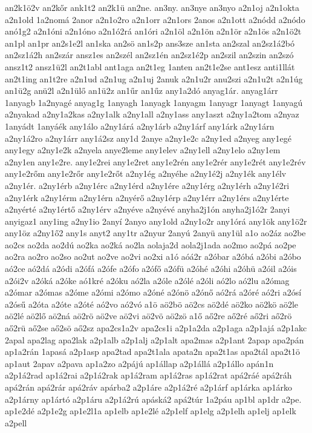 {an2k1ö2v
an2kőr
ank1t2
an2k1ü
an2ne.
an3ny.
an3nye
an3nyo
a2n1oj
a2n1okta
a2n1old
1a2nomá
2anor
a2n1o2ro
a2n1orr
a2n1ors
2anos
a2n1ott
a2nódd
a2nódo
anó1g2
a2n1óni
a2n1óno
a2n1ó2rá
an1óri
a2n1öl
a2n1ön
a2n1ör
a2n1ös
a2n1ö2t
an1pl
an1pr
an2s1e2l
an1ska
an2sö
an1s2p
ans3sze
an1sta
an2szal
an2sz1á2bó
an2sz1á2h
an2szár
ansz1es
an2szél
an2sz1én
an2sz1é2p
an2szil
an2szin
an2szó
ansz1t2
ansz1ü2l
an2t1abl
ant1aga
an2t1eg
1anten
an2t1e2se
ant1esz
anti1llát
an2t1ing
an1t2re
a2n1ud
a2n1ug
a2n1uj
2anuk
a2n1u2r
anu2szi
a2n1u2t
a2n1úg
an1ü2g
anü2l
a2n1ülő
an1ü2z
an1űr
an1űz
any1a2dó
anyag1ár.
anyag1árr
1anyagb
1a2nyagé
anyag1g
1anyagh
1anyagk
1anyagm
1anyagr
1anyagt
1anyagú
a2nyakad
a2ny1a2kas
a2ny1alk
a2ny1all
a2ny1ass
any1aszt
a2ny1a2tom
a2nyaz
1anyádt
1anyáék
any1álo
a2ny1árá
a2ny1árb
a2ny1árf
any1árk
a2ny1árn
a2ny1á2ro
a2ny1árr
any1á2sz
any1d
2anye
a2ny1e2c
a2ny1ed
a2nyeg
any1egé
any1egy
a2ny1e2k
a2nyela
anye2leme
any1elev
a2ny1ell
a2ny1elo
a2ny1em
a2ny1en
any1e2re.
any1e2rei
any1e2ret
any1e2rén
any1e2rér
any1e2rét
any1e2rév
any1e2rőm
any1e2rőr
any1e2rőt
a2ny1ég
a2nyéhe
a2ny1é2j
a2ny1ék
any1élv
a2ny1ér.
a2ny1érb
a2ny1érc
a2ny1érd
a2ny1ére
a2ny1érg
a2ny1érh
a2ny1é2ri
a2ny1érk
a2ny1érm
a2ny1érn
a2nyérő
a2ny1érp
a2ny1érr
a2ny1érs
a2ny1érte
a2nyérté
a2ny1értő
a2ny1érv
a2nyéve
a2nyévé
anyha2j1ón
anyha2j1ó2r
2anyi
anyigaz1
any1ing
a2ny1io
2anyí
2anyo
any1old
a2ny1o2r
any1órá
any1ök
any1ö2r
any1öz
a2ny1ő2
any1s
anyt2
any1tr
a2nyur
2anyú
2anyü
any1ül
a1o
ao2áz
ao2be
ao2cs
ao2da
ao2dú
ao2ka
ao2ká
ao2la
aolaja2d
aola2j1ada
ao2mo
ao2pá
ao2pe
ao2ra
ao2ro
ao2so
ao2ut
ao2ve
ao2vi
ao2xi
a1ó
aóá2r
a2óbar
a2óbá
a2óbi
a2óbo
aó2ce
aó2dá
a2ódi
a2ófá
a2ófe
a2ófo
a2ófő
a2ófü
a2óhé
a2óhi
a2óhü
a2óil
a2óis
a2ói2v
a2óká
a2óke
aó1kré
a2óku
aó2la
a2óle
a2ólé
a2óli
aó2lo
aó2lu
a2ómag
a2ómar
a2ómas
a2óme
a2ómi
a2ómo
a2óné
a2ónö
a2ónő
aó2rá
a2óré
aó2ri
a2ósí
a2ósű
a2óta
a2óte
a2óté
aó2vo
aó2vó
a1ö
aö2bö
aö2cs
aö2dé
aö2ko
aö2kö
aö2le
aö2lé
aö2lő
aö2ná
aö2rö
aö2ve
aö2vi
aö2vö
aö2zö
a1ő
aő2re
aő2ré
aő2ri
aő2rö
aő2rü
aő2se
aő2sö
aő2sz
apa2cs1a2v
apa2cs1i
a2p1a2da
a2p1aga
a2p1ajá
a2p1akc
2apal
apa2lag
apa2lak
a2p1alb
a2p1alj
a2p1alt
apa2mas
a2p1ant
2apap
apa2pán
ap1a2rán
1apasá
a2p1asp
apa2tad
apa2t1ala
apata2n
apa2t1as
apa2tál
apa2t1ö
ap1aut
2apav
a2pava
ap1a2zo
a2pájú
ap1állap
a2p1állá
a2p1állo
apán1n
a2p1á2rad
ap1á2rai
a2p1á2rak
ap1á2ram
ap1á2ras
ap1á2rat
apá2ráé
apá2ráh
apá2rán
apá2rár
apá2ráv
apárba2
a2p1áre
a2p1á2ré
a2p1árf
ap1árka
ap1árko
a2p1árny
ap1ártó
a2p1áru
a2p1á2rú
apáská2
apá2túr
1a2páu
ap1bl
ap1dr
a2pe.
ap1e2dé
a2p1e2g
ap1e2l1a
ap1elb
ap1e2lé
a2p1elf
ap1elg
a2p1elh
ap1elj
ap1elk
a2pell
}
